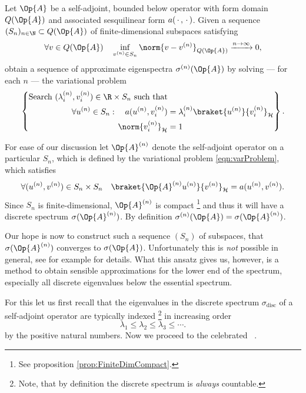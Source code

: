 \begin{defn}
	\label{defn:RitzGalerkin}
	Let $\Op{A}$ be a self-adjoint, bounded below operator
	with form domain $Q(\Op{A})$ and associated sesquilinear form $a(\,\cdot\,,\,\cdot\,)$.
	Given a sequence $(S_n)_{n\in\N} \subset Q(\Op{A})$
	of finite-dimensional subspaces satisfying
	\begin{equation}
		\forall v \in Q(\Op{A}) \quad \inf_{v^{(n)} \in S_n} \norm{v - v^{(n)}}_{Q(\Op{A})} \xrightarrow{n\to \infty} 0,
		\label{eqn:CondSubspaces}
	\end{equation}
	obtain a sequence of approximate eigenspectra $\sigma^{(n)}(\Op{A})$
	by solving --- for each $n$ --- the variational problem
	\begin{equation}
		\label{eqn:varProblem}
		\left\{
		\begin{aligned}
			\text{Search $(\lambda_i^{(n)}, v_i^{(n)}) \in \R \times S_n$ such that} & \\
			\forall u^{(n)} \in S_n: \quad a(u^{(n)}, v_i^{(n)})
			&= \lambda_i^{(n)} \braket{u^{(n)}}{v_i^{(n)}}_\hilbert \\
			\norm{v_i^{(n)}}_\hilbert &= 1
		\end{aligned}
		\right\}.
	\end{equation}
\end{defn}
For ease of our discussion let $\Op{A}^{(n)}$ denote the self-adjoint
operator on a particular $S_n$, which is defined by the variational problem
\eqref{eqn:varProblem}, \ie which satisfies
\[ \forall (u^{(n)}, v^{(n)}) \in S_n \times S_n \quad \braket{\Op{A}^{(n)} u^{(n)}}{v^{(n)}}_\hilbert = a(u^{(n)}, v^{(n)}). \]
Since $S_n$ is finite-dimensional, $\Op{A}^{(n)}$ is compact%
\footnote{See proposition \vref{prop:FiniteDimCompact}.}
and thus it will have a discrete spectrum $\sigma(\Op{A}^{(n)})$.
By definition $\sigma^{(n)}(\Op{A}) = \sigma(\Op{A}^{(n)})$.

Our hope is now to construct such a sequence $(S_n)$ of subspaces,
that $\sigma(\Op{A}^{(n)})$ converges to $\sigma(\Op{A})$.
Unfortunately this is \emph{not} possible in general,
see for example \cite{Helffer2013} for details.
What this ansatz gives us, however, is a method to obtain
sensible approximations for the lower end of the spectrum,
especially all discrete eigenvalues below the essential spectrum.

For this let us first recall that the eigenvalues
in the discrete spectrum $\sigma_\text{disc}$
of a self-adjoint operator are typically indexed%
\footnote{Note, that by definition the discrete spectrum is \emph{always} countable.}
in increasing order
\[ \lambda_1 \leq \lambda_2 \leq \lambda_3 \leq \cdots. \]
by the positive natural numbers.
Now we proceed to the celebrated ~\cite[p. 146]{Helffer2013}.

